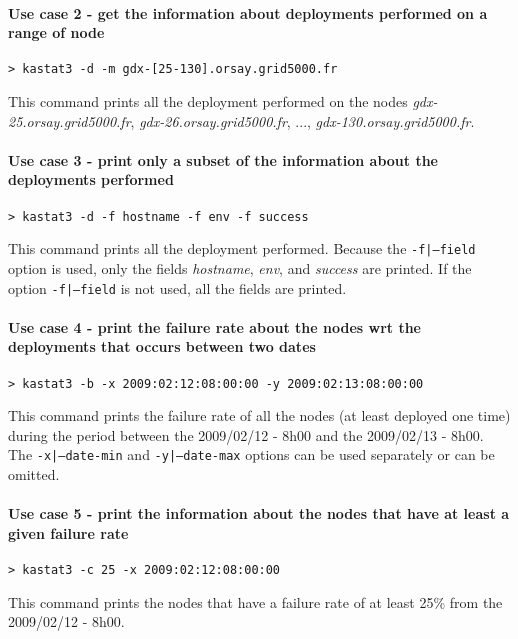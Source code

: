 \documentclass[a4wide,10pt,oneside]{book}
\begin{document}
\paragraph{Use case 2 - get the information about deployments performed on a range of node}
\begin{verbatim}
> kastat3 -d -m gdx-[25-130].orsay.grid5000.fr
\end{verbatim}
This command prints all the deployment performed on the nodes \textit{gdx-25.orsay.grid5000.fr}, \textit{gdx-26.orsay.grid5000.fr}, ..., \textit{gdx-130.orsay.grid5000.fr}.

\paragraph{Use case 3 - print only a subset of the information about the deployments performed}
\begin{verbatim}
> kastat3 -d -f hostname -f env -f success
\end{verbatim}
This command prints all the deployment performed. Because the \texttt{-f|--field} option is used, only the fields \textit{hostname}, \textit{env}, and \textit{success} are printed. If the option \texttt{-f|--field} is not used, all the fields are printed.

\paragraph{Use case 4 - print the failure rate about the nodes wrt the deployments that occurs between two dates}
\begin{verbatim}
> kastat3 -b -x 2009:02:12:08:00:00 -y 2009:02:13:08:00:00
\end{verbatim}
This command prints the failure rate of all the nodes (at least deployed one time) during the period between the 2009/02/12 - 8h00 and the 2009/02/13 - 8h00. The \texttt{-x|--date-min} and \texttt{-y|--date-max} options can be used separately or can be omitted.

\paragraph{Use case 5 - print the information about the nodes that have at least a given failure rate}
\begin{verbatim}
> kastat3 -c 25 -x 2009:02:12:08:00:00
\end{verbatim}
This command prints the nodes that have a failure rate of at least 25\% from the 2009/02/12 - 8h00.
\end{document}
